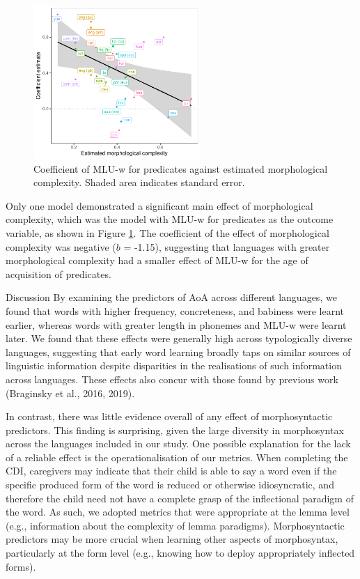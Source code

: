 \documentclass[10pt, letterpaper]{article}
\newenvironment{CodeChunk}{}{}
\begin{document}
\begin{CodeChunk}
\begin{figure}[ht]

{\centering \includegraphics[width=240px]{figs/mlu_pred-1} 

}

\caption[Coefficient of MLU-w for predicates against estimated morphological complexity]{Coefficient of MLU-w for predicates against estimated morphological complexity. Shaded area indicates standard error.}\label{fig:mlu_pred}
\end{figure}
\end{CodeChunk}

Only one model demonstrated a significant main effect of morphological
complexity, which was the model with MLU-w for predicates as the outcome
variable, as shown in Figure \ref{fig:mlu_pred}. The coefficient of the
effect of morphological complexity was negative (\(b\) = -1.15),
suggesting that languages with greater morphological complexity had a
smaller effect of MLU-w for the age of acquisition of predicates.

Discussion By examining the predictors of AoA across different
languages, we found that words with higher frequency, concreteness, and
babiness were learnt earlier, whereas words with greater length in
phonemes and MLU-w were learnt later. We found that these effects were
generally high across typologically diverse languages, suggesting that
early word learning broadly taps on similar sources of linguistic
information despite disparities in the realisations of such information
across languages. These effects also concur with those found by previous
work (Braginsky et al., 2016, 2019).

In contrast, there was little evidence overall of any effect of
morphosyntactic predictors. This finding is surprising, given the large
diversity in morphosyntax across the languages included in our study.
One possible explanation for the lack of a reliable effect is the
operationalisation of our metrics. When completing the CDI, caregivers
may indicate that their child is able to say a word even if the specific
produced form of the word is reduced or otherwise idiosyncratic, and
therefore the child need not have a complete grasp of the inflectional
paradigm of the word. As such, we adopted metrics that were appropriate
at the lemma level (e.g., information about the complexity of lemma
paradigms). Morphosyntactic predictors may be more crucial when learning
other aspects of morphosyntax, particularly at the form level (e.g.,
knowing how to deploy appropriately inflected forms).
\end{document}
